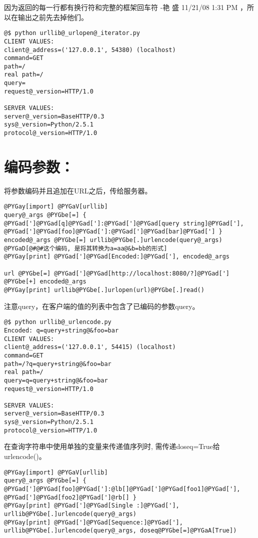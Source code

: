 \documentclass[a4paper,10pt,english]{manual}
\begin{document}
因为返回的每一行都有换行符和完整的框架回车符 -艳 盛 11/21/08 1:31 PM ，所以在输出之前先去掉他们。

\begin{Verbatim}[commandchars=@\[\]]
@$ python urllib@_urlopen@_iterator.py
CLIENT VALUES:
client@_address=('127.0.0.1', 54380) (localhost)
command=GET
path=/
real path=/
query=
request@_version=HTTP/1.0

SERVER VALUES:
server@_version=BaseHTTP/0.3
sys@_version=Python/2.5.1
protocol@_version=HTTP/1.0
\end{Verbatim}


\section{编码参数：}

将参数编码并且追加在URL之后，传给服务器。

\begin{Verbatim}[commandchars=@\[\]]
@PYGay[import] @PYGaV[urllib]
query@_args @PYGbe[=] { @PYGad[']@PYGad[q]@PYGad[']:@PYGad[']@PYGad[query string]@PYGad['], @PYGad[']@PYGad[foo]@PYGad[']:@PYGad[']@PYGad[bar]@PYGad['] }
encoded@_args @PYGbe[=] urllib@PYGbe[.]urlencode(query@_args) @PYGaD[@#@#这个编码, 是将其转换为a=aa@&b=bb的形式]
@PYGay[print] @PYGad[']@PYGad[Encoded:]@PYGad['], encoded@_args

url @PYGbe[=] @PYGad[']@PYGad[http://localhost:8080/?]@PYGad['] @PYGbe[+] encoded@_args
@PYGay[print] urllib@PYGbe[.]urlopen(url)@PYGbe[.]read()
\end{Verbatim}

注意query，在客户端的值的列表中包含了已编码的参数query。

\begin{Verbatim}[commandchars=@\[\]]
@$ python urllib@_urlencode.py
Encoded: q=query+string@&foo=bar
CLIENT VALUES:
client@_address=('127.0.0.1', 54415) (localhost)
command=GET
path=/?q=query+string@&foo=bar
real path=/
query=q=query+string@&foo=bar
request@_version=HTTP/1.0

SERVER VALUES:
server@_version=BaseHTTP/0.3
sys@_version=Python/2.5.1
protocol@_version=HTTP/1.0
\end{Verbatim}

在查询字符串中使用单独的变量来传递值序列时, 需传递doseq=True给urlencode()。

\begin{Verbatim}[commandchars=@\[\]]
@PYGay[import] @PYGaV[urllib]
query@_args @PYGbe[=] { @PYGad[']@PYGad[foo]@PYGad[']:@lb[]@PYGad[']@PYGad[foo1]@PYGad['], @PYGad[']@PYGad[foo2]@PYGad[']@rb[] }
@PYGay[print] @PYGad[']@PYGad[Single :]@PYGad['], urllib@PYGbe[.]urlencode(query@_args)
@PYGay[print] @PYGad[']@PYGad[Sequence:]@PYGad['], urllib@PYGbe[.]urlencode(query@_args, doseq@PYGbe[=]@PYGaA[True])
\end{Verbatim}
\end{document}
